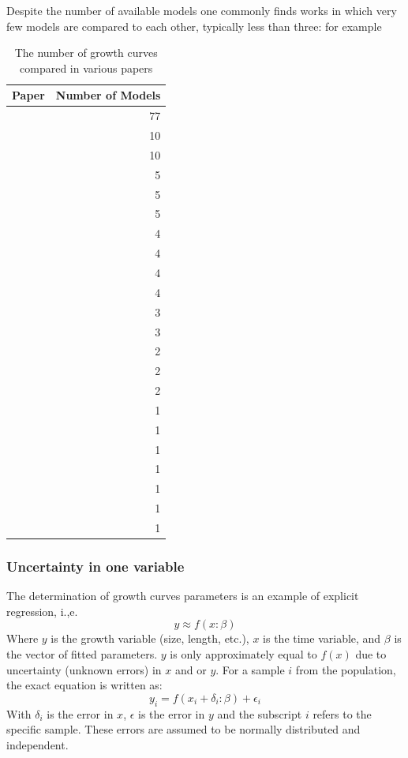 \documentclass[12pt,a4paper]{article}
\begin{document}
	
	Despite the number of available models one commonly finds works in which very few models are compared to each other, typically less than three: for example 
	\begin{table}
	\centering
	\begin{tabular}{l r}
		\hline
		Paper & Number of Models \\
		\hline
		\textcite{Myhrvold2013}&77 \\
		\textcite{Do2019}&10\\
		\textcite{Garcia-Muniz2019}&10  \\ %
		\textcite{GhaviHossein-Zadeh2015} & 5\\
		\textcite{Kheirabadi2019} & 5\\
		\textcite{Cooper2008}&5\\
		\textcite{Gbangboche2008}&4\\
		\textcite{Araujo2012}&4\\
		\textcite{Keskin2009} &4\\
		\textcite{Perotto1992}&4\\
		\textcite{Xie2020}&3\\
		\textcite{Erickson2015}&3  \\
		\textcite{DeNise1985} &2\\
		\textcite{Waheed2011}&2\\
		\textcite{Yakupoglu2001}&2\\
		\textcite{Ersoy2006}&1 \\
		\textcite{Bathaei1998}&1 \\
		\textcite{Raji2014}&1\\
		\textcite{Ghiasi2018}&1\\
		\textcite{Li2019}&1\\
		\textcite{Lehman2008}&1\\
		\textcite{Chinsamy1990}&1\\
		\hline
	\end{tabular}
	\caption{The number of growth curves compared in various papers}
		\end{table}
	\subsubsection{Uncertainty in one variable}
	The determination of growth curves parameters is an example of explicit regression, i.,e.
	\begin{equation}
	y \approx f(x:\beta)
	\end{equation}
	Where $y$ is the growth variable (size, length, etc.), $x$ is the time variable, and $\beta$ is the vector of fitted parameters. $y$ is only approximately equal to $f(x)$ due to uncertainty (unknown errors) in $x$ and or $y$. For a sample $i$ from the population, the exact equation is written as:
	\begin{equation}
	y_i = f(x_i+\delta_i:\beta)+\epsilon_i
	\end{equation}
	With $\delta_i$ is the error in $x$, $\epsilon$ is the error in $y$ and the subscript $i$ refers to the specific sample. These errors are assumed to be normally distributed and independent.
	
\end{document}
